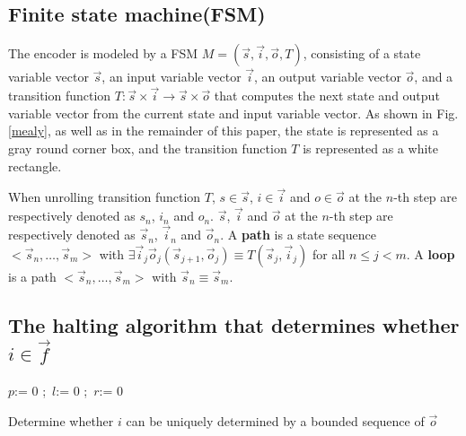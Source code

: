 \documentclass[conference]{IEEEtran}
\begin{document}
\subsection{Finite state machine(FSM)}\label{subsec_fsm}



The encoder is modeled by a FSM $M=(\vec{s},\vec{i},\vec{o},T)$,
consisting of a state variable vector $\vec{s}$,
an input variable vector $\vec{i}$,
an output variable vector $\vec{o}$,
and a transition function $T: \vec{s}\times \vec{i}\to \vec{s}\times \vec{o}$ 
that computes the next state and output variable vector from the current state and input variable vector.
As shown in Fig. \ref{mealy},
as well as in the remainder of this paper,
the state is represented as a gray round corner box,
and the transition function $T$ is represented as a white rectangle.

When unrolling transition function $T$,
$s\in\vec{s}$,  $i\in\vec{i}$ and  $o\in\vec{o}$ at the $n$-th step 
are respectively denoted as $s_n$, $i_n$ and $o_n$.
$\vec{s}$, $\vec{i}$ and $\vec{o}$ at the $n$-th step are respectively denoted as $\vec{s}_n$, $\vec{i}_n$ and $\vec{o}_n$.
A \textbf{path} is a state sequence $<\vec{s}_n,\dots,\vec{s}_m>$ with $\exists \vec{i}_j\vec{o}_j (\vec{s}_{j+1},\vec{o}_j)\equiv T(\vec{s}_j,\vec{i}_j)$ for all $n\le j< m$.
A \textbf{loop} is a path $<\vec{s}_n,\dots,\vec{s}_m>$ with $\vec{s}_n\equiv \vec{s}_m$.



\subsection{The halting algorithm that determines whether $i\in\vec{f}$}\label{subsec_chkextdec}

\begin{algorithm}[b]
\SetAlgoVlined
{}
$p$:= 0 ;~$l$:= 0 ;~$r$:= 0 \;
\caption{Determine whether $i$ can be uniquely determined by a bounded sequence of $\vec{o}$}
\label{alg_fofc}
\end{algorithm}
\end{document}
